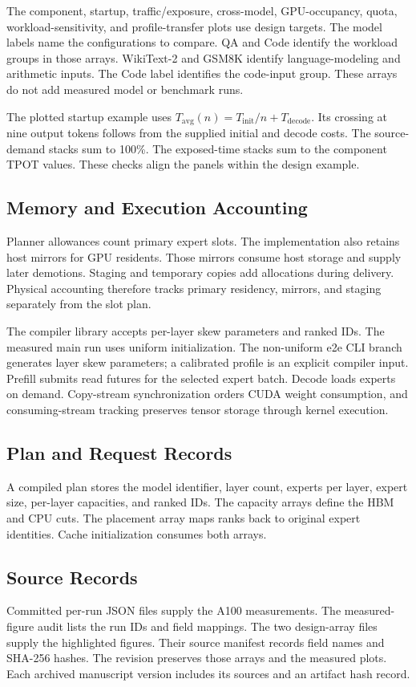 \documentclass[conference,9pt,letterpaper]{IEEEtran}
\begin{document}
The component, startup, traffic/exposure, cross-model, GPU-occupancy, quota, workload-sensitivity, and profile-transfer plots use design targets. The model labels name the configurations to compare. QA and Code identify the workload groups in those arrays. WikiText-2 and GSM8K identify language-modeling and arithmetic inputs. The Code label identifies the code-input group. These arrays do not add measured model or benchmark runs.

The plotted startup example uses $T_{\mathrm{avg}}(n)=T_{\mathrm{init}}/n+T_{\mathrm{decode}}$. Its crossing at nine output tokens follows from the supplied initial and decode costs. The source-demand stacks sum to 100\%. The exposed-time stacks sum to the component TPOT values. These checks align the panels within the design example.

\subsection{Memory and Execution Accounting}
Planner allowances count primary expert slots. The implementation also retains host mirrors for GPU residents. Those mirrors consume host storage and supply later demotions. Staging and temporary copies add allocations during delivery. Physical accounting therefore tracks primary residency, mirrors, and staging separately from the slot plan.

The compiler library accepts per-layer skew parameters and ranked IDs. The measured main run uses uniform initialization. The non-uniform e2e CLI branch generates layer skew parameters; a calibrated profile is an explicit compiler input. Prefill submits read futures for the selected expert batch. Decode loads experts on demand. Copy-stream synchronization orders CUDA weight consumption, and consuming-stream tracking preserves tensor storage through kernel execution.

\subsection{Plan and Request Records}
A compiled plan stores the model identifier, layer count, experts per layer, expert size, per-layer capacities, and ranked IDs. The capacity arrays define the HBM and CPU cuts. The placement array maps ranks back to original expert identities. Cache initialization consumes both arrays.

\subsection{Source Records}
Committed per-run JSON files supply the A100 measurements. The measured-figure audit lists the run IDs and field mappings. The two design-array files supply the highlighted figures. Their source manifest records field names and SHA-256 hashes. The revision preserves those arrays and the measured plots. Each archived manuscript version includes its sources and an artifact hash record.
\end{document}
